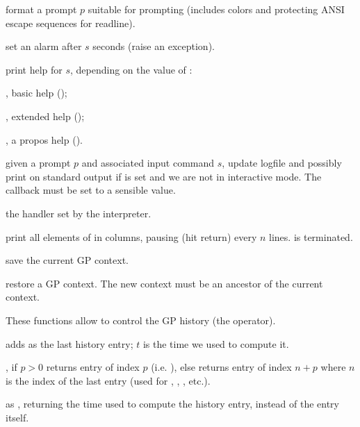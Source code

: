  format a prompt $p$
suitable for  prompting (includes colors and protecting ANSI escape
sequences for readline).

 set an alarm after $s$ seconds (raise an
 exception).

 print help for $s$, depending
on the value of \fl:

\item {}, basic help ();

\item {}, extended help ();

\item {}, a propos help ().

 given a prompt
$p$ and associated input command $s$, update logfile and possibly
print on standard output if  is set and we are not in interactive
mode. The callback  must be set to a sensible
value.

 the  handler
set by the  interpreter.

print all elements of  in columns, pausing (hit return)
every $n$ lines.  is  terminated.


 save the current GP
context.

 restore a GP context.
The new context must be an ancestor of the current context.


These functions allow to control the GP history (the \kbd{\%} operator).

 adds  as the last history
entry; $t$ is the time we used to compute it.

, if $p>0$ returns entry of index $p$
(i.e. ), else returns entry of index $n+p$ where $n$ is the
index of the last entry (used for \kbd{\%}, , , etc.).

 as ,
returning the time used to compute the history entry, instead of the entry
itself.

